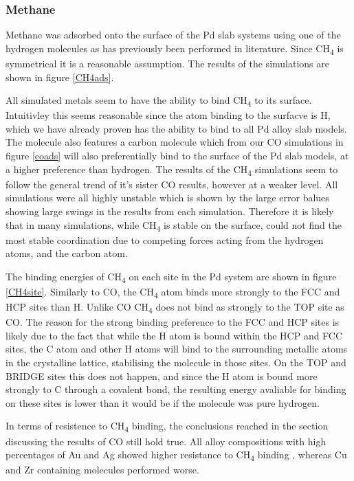 \subsubsection{Methane}

Methane was adsorbed onto the surface of the Pd slab systems using one of the hydrogen molecules as has previously been performed in literature. \cite{doi:10.1021/acsomega.8b02578} Since CH\textsubscript{4} is symmetrical it is a reasonable assumption. The results of the simulations are shown in figure \ref{CH4ads}. 

All simulated metals seem to have the ability to bind CH\textsubscript{4} to its surface. Intuitivley this seems reasonable since the atom binding to the surfacve is H, which we have already proven has the ability to bind to all Pd alloy slab models. The molecule also features a carbon molecule which from our CO simulations in figure \ref{coads} will also preferentially bind to the surface of the Pd slab models, at a higher preference than hydrogen. The results of the CH\textsubscript{4} simulations seem to follow the general trend of it's sister CO results, however at a weaker level.  All simulations were all highly unstable which is shown by the large error balues showing large swings in the results from each simulation. Therefore it is likely that in many simulations, while CH\textsubscript{4} is stable on the surface, could not find the most stable coordination due to competing forces acting from the hydrogen atoms, and the carbon atom. 

The binding energies of CH\textsubscript{4} on each site in the Pd system are shown in figure \ref{CH4site}. Similarly to CO, the CH\textsubscript{4} atom binds more strongly to the FCC and HCP sites than H. Unlike CO CH\textsubscript{4} does not bind as strongly to the TOP site as CO. The reason for the strong binding preference to the FCC and HCP sites is likely due to the fact that while the H atom is bound within the HCP and FCC sites, the C atom and other H atoms will bind to the surrounding metallic atoms in the crystalline lattice, stabilising the molecule in those sites. On the TOP and BRIDGE sites this does not happen, and since the H atom is bound more strongly to C through a covalent bond, the resulting energy avaliable for binding on these sites is lower than it would be if the molecule was pure hydrogen. 

In terms of resistence to CH\textsubscript{4} binding, the conclusions reached in the section discussing the results of CO still hold true. All alloy compositions with high percentages of Au and Ag showed higher resistance to CH\textsubscript{4} binding , whereas Cu and Zr containing molecules performed worse. 

